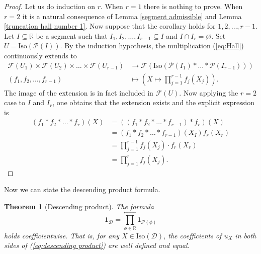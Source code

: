 \documentclass[a4paper,12pt]{amsart}
\numberwithin{equation}{section}
\newtheorem{theorem}{Theorem}[section]
\newcommand{\Iso}{\mathrm{Iso}}
\newcommand{\1}{\mathbf{1}}
\begin{document}
\begin{proof}
    Let us do induction on $r$. When $r=1$ there is nothing to prove. When $r=2$ it is a natural consequence of Lemma \ref{segment admissible} and Lemma \ref{truncation hall number 1}. Now suppose that the corollary holds for $1,2,\dots, r-1$. Let $I\subseteq\mathbb{R}$ be a segment such that $I_1,I_2,\dots,I_{r-1}\subseteq I$ and $I\cap I_r=\varnothing$. Set $U=\Iso(\mathcal{P}(I))$. By the induction hypothesis, the multiplication (\ref{eq:Hall}) continuously extends to
    \begin{align*}
        \mathscr{F}(U_1)\times\mathscr{F}(U_2)\times\dots\times\mathscr{F}(U_{r-1})&\rightarrow\mathscr{F}(\Iso(\mathcal{P}(I_1)*\dots*\mathcal{P}(I_{r-1})))\\
        (f_1,f_2,\dots,f_{r-1})&\mapsto\left(X\mapsto\prod_{j=1}^{r-1}f_j(X_j)\right).
    \end{align*}
    The image of the extension is in fact included in $\mathscr{F}(U)$. Now applying the $r=2$ case to $I$ and $I_r$, one obtains that the extension exists and the explicit expression is
    \begin{align*}
        (f_1*f_2*\dots*f_r)(X)&=((f_1*f_2*\dots*f_{r-1})*f_r)(X)\\
        &=(f_1*f_2*\dots*f_{r-1})(X_I)f_r(X_r)\\
        &=\prod_{j=1}^{r-1}f_j(X_j)\cdot f_r(X_r)\\
        &=\prod_{j=1}^{r}f_j(X_j).
    \end{align*}
\end{proof}
Now we can state the descending product formula.
\begin{theorem}[Descending product]\label{descending product}
    The formula
    \begin{equation}\label{eq:descending product}
        \1_{\mathcal{D}}=\prod_{\phi\in\mathbb{R}}^\leftarrow\1_{\mathcal{P}(\phi)}
    \end{equation}
    holds coefficientwise. That is, for any $X\in\Iso(\mathcal{D})$, the coefficients of $u_X$ in both sides of (\ref{eq:descending product}) are well defined and equal.
\end{theorem}
\end{document}
